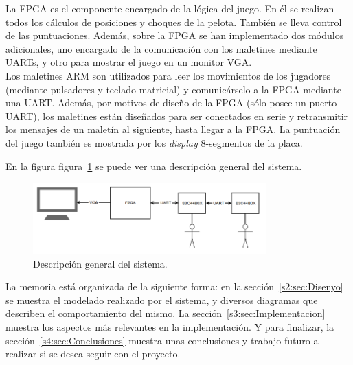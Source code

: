 La FPGA es el componente encargado de la lógica del juego. En él se
realizan todos los cálculos de posiciones y choques de la pelota. También
se lleva control de las puntuaciones. Además, sobre la FPGA se han
implementado dos módulos adicionales, uno encargado de la comunicación con
los maletines mediante UARTs, y otro para mostrar el juego en un monitor
VGA.\\
Los maletines ARM son utilizados para leer los movimientos de los jugadores
(mediante pulsadores y teclado matricial) y comunicárselo a la FPGA
mediante una UART. Además, por motivos de diseño de la FPGA (sólo posee un
puerto UART), los maletines están diseñados para ser conectados en serie y
retransmitir los mensajes de un maletín al siguiente, hasta llegar a la
FPGA. La puntuación del juego también es mostrada por los \textit{display}
8-segmentos de la placa.

En la figura figura~\ref{s1:fig:vista_general_sistema} se puede ver una
descripción general del sistema.\\

\begin{figure}[h]
  \centering
  \includegraphics[width=0.8\textwidth]{images/descripcion_general.png}
  \caption{Descripción general del sistema.}
  \label{s1:fig:vista_general_sistema}
\end{figure}


La memoria está organizada de la siguiente forma:
en la sección~\ref{s2:sec:Disenyo} se muestra el modelado realizado por el
sistema, y diversos diagramas que describen el comportamiento del mismo. La
sección~\ref{s3:sec:Implementacion} muestra los aspectos más relevantes en
la implementación. Y para finalizar, la sección~\ref{s4:sec:Conclusiones}
muestra unas conclusiones y trabajo futuro a realizar si se desea seguir
con el proyecto.








%
%


